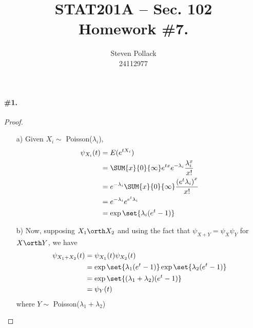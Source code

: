 \documentclass[12pt,titlepage]{article}\usepackage{graphicx, color}
\title{STAT201A -- Sec. 102 \\ Homework \#7. }
\author{Steven Pollack \\ 24112977}
\date{}
\begin{document}
\maketitle

\pagestyle{empty}
\newpage
\pagestyle{fancy}
\paragraph{\#1.}
\begin{proof}
\begin{enumerate}
\item[a)] Given $X_i \sim$ Poisson($\lambda_i$), 
\begin{align*}
\psi_{X_i}(t) &= E(e^{tX_i}) \\
&= \SUM{x}{0}{\infty} e^{tx} e^{-\lambda_i} \frac{\lambda_i^x}{x!} \\
&= e^{-\lambda_i} \SUM{x}{0}{\infty} \frac{\left(e^{t}\lambda_i\right)^{x}}{x!} \\
&= e^{-\lambda_i} e^{e^{t} \lambda_i} \\
&= \exp\set{\lambda_{i}(e^{t}-1)} 
\end{align*}
\item[b)] Now, supposing $X_1 \orth X_2$ and using the fact that $\psi_{X+Y} = \psi_X \psi_{Y}$ for $X \orth Y$, we have
\begin{align*}
\psi_{X_1+X_2}(t) &= \psi_{X_1}(t) \psi_{X_2}(t) \\
&= \exp\set{\lambda_{1}(e^{t}-1)}  \exp\set{\lambda_{2}(e^{t}-1)} \\
&= \exp\set{(\lambda_1+\lambda_2)(e^{t}-1)} \\
&= \psi_{Y}(t)
\end{align*}
where $Y \sim$ Poisson($\lambda_1 + \lambda_2$)
\end{enumerate}
\end{proof}
\end{document}
